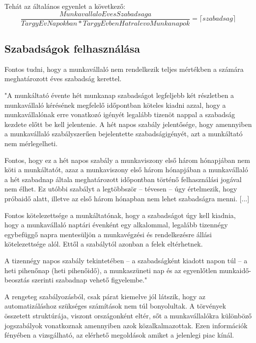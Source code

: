 Tehát az általános egyenlet a következő:
\begin{equation}\label{szabadság Számítás Tört Év esetén}
		\frac{MunkavallaloEvesSzabadsaga}{TargyEvNapokban*TargyEvbenHatralevoMunkanapok}=\lceil szabadsag \rceil
\end{equation}

\subsection{Szabadságok felhasználása}

Fontos tudni, hogy a munkavállaló nem rendelkezik teljes mértékben a számára meghatározott éves szabadság kerettel.

"A munkáltató évente hét munkanap szabadságot legfeljebb két részletben a munkavállaló kérésének megfelelő időpontban köteles kiadni azzal, hogy a munkavállalónak erre vonatkozó igényét legalább tizenöt nappal a szabadság kezdete előtt be kell jelentenie. A hét napos szabály jelentősége, hogy amennyiben a munkavállaló szabályszerűen bejelentette szabadságigényét, azt a munkáltató nem mérlegelheti.

Fontos, hogy ez a hét napos szabály a munkaviszony első három hónapjában nem köti a munkáltatót, azaz a munkaviszony első három hónapjában a munkavállaló a hét szabadnap általa meghatározott időpontban történő felhasználási jogával nem élhet. Ez utóbbi szabályt a legtöbbször – tévesen – úgy értelmezik, hogy próbaidő alatt, illetve az első három hónapban nem lehet szabadságra menni. [...]

Fontos kötelezettsége a munkáltatónak, hogy a szabadságot úgy kell kiadnia, hogy a munkavállaló naptári évenként egy alkalommal, legalább tizennégy egybefüggő napra mentesüljön a munkavégzési és rendelkezésre állási kötelezettsége alól. Ettől a szabálytól azonban a felek eltérhetnek.

A tizennégy napos szabály tekintetében – a szabadságként kiadott napon túl – a heti pihenőnap (heti pihenőidő), a munkaszüneti nap és az egyenlőtlen munkaidő-beosztás szerinti szabadnap vehető figyelembe." \cite{szabadsagFelhasznalasa}


A rengeteg szabályozásból, csak párat kiemelve jól látszik, hogy az automatizáláshoz szükséges számítások nem túl bonyolultak. A törvények összetett struktúrája, viszont országonként eltér, sőt a munkavállalókra különböző jogszabályok vonatkoznak amennyiben azok közalkalmazottak. Ezen információk fényében a vizsgálható, az elérhető megoldások amiket a jelenlegi piac kínál.

